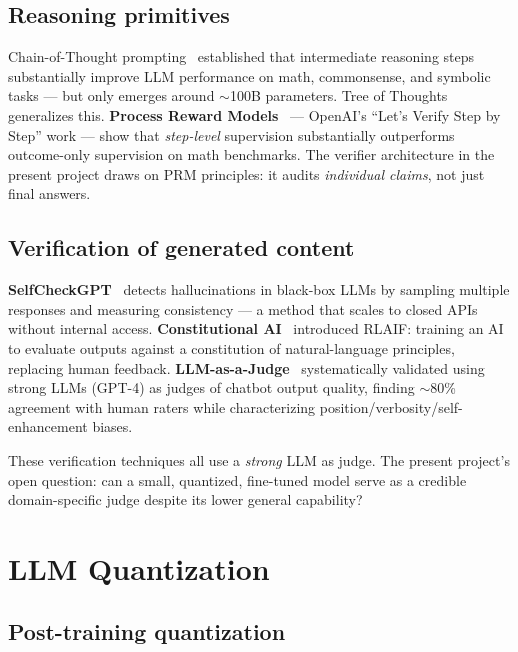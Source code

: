 \documentclass[11pt]{article}
\begin{document}
\subsection{Reasoning primitives}

Chain-of-Thought prompting~\cite{wei2022chainofthought} established that intermediate reasoning steps substantially improve LLM performance on math, commonsense, and symbolic tasks --- but only emerges around $\sim$100B parameters. Tree of Thoughts~\cite{yao2023treeofthoughts} generalizes this. \textbf{Process Reward Models}~\cite{lightman2023verifystepbystep} --- OpenAI's ``Let's Verify Step by Step'' work --- show that \emph{step-level} supervision substantially outperforms outcome-only supervision on math benchmarks. The verifier architecture in the present project draws on PRM principles: it audits \emph{individual claims}, not just final answers.

\subsection{Verification of generated content}

\textbf{SelfCheckGPT}~\cite{manakul2023selfcheckgpt} detects hallucinations in black-box LLMs by sampling multiple responses and measuring consistency --- a method that scales to closed APIs without internal access. \textbf{Constitutional AI}~\cite{bai2022constitutional} introduced RLAIF: training an AI to evaluate outputs against a constitution of natural-language principles, replacing human feedback. \textbf{LLM-as-a-Judge}~\cite{zheng2023llmjudge} systematically validated using strong LLMs (GPT-4) as judges of chatbot output quality, finding $\sim$80\% agreement with human raters while characterizing position/verbosity/self-enhancement biases.

These verification techniques all use a \emph{strong} LLM as judge. The present project's open question: can a small, quantized, fine-tuned model serve as a credible domain-specific judge despite its lower general capability?

\section{LLM Quantization}

\subsection{Post-training quantization}
\end{document}

